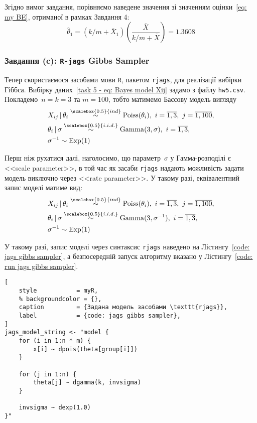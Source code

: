 Згідно вимог завдання, порівняємо наведене значення зі значенням оцінки~\eqref{eq: my BE}, отриманої в рамках Завдання 4:
\begin{equation}\label{eq: R-base theta star estimation}
    \widehat{\theta}_1 = \left( k/m+\overline{X}_1 \right)\left( \frac{\overline{X}}{k/m+\overline{X}} \right) = 1.3608
\end{equation}

\newpage
\subsubsection*{Завдання (c): \texttt{R-jags} Gibbs Sampler}

Тепер скористаємося засобами мови \texttt{R}, пакетом \texttt{rjags}, для реалізації вибірки Гіббса. Вибірку даних~\eqref{task 5 - eq: Bayes model Xij} задамо з файлу \texttt{hw5.csv}. Покладемо~$n=k=3$ та $m=100$, тобто матимемо Баєсову модель вигляду
\begin{align}
    & X_{ij} \,|\, \theta_i \overset{\scalebox{0.5}{ind}}{\sim} \mathrm{Poiss}(\theta_i),\ i=\overline{1,3},\ j=\overline{1,100}, \\
    & \theta_i \,|\, \sigma \overset{\scalebox{0.5}{i.i.d.}}{\sim} \mathrm{Gamma}(3,\sigma),\ i=\overline{1,3}, \\
    & \sigma^{-1} \sim \mathrm{Exp}(1)
\end{align}

Перш ніж рухатися далі, наголосимо, що параметр~$\sigma$ у Гамма-розподілі є <<scale parameter>>, в той час як засаби \texttt{rjags} надають можливість задати модель виключно через <<rate parameter>>. У такому разі, еквівалентний запис моделі матиме вид:
\begin{align}
    & X_{ij} \,|\, \theta_i \overset{\scalebox{0.5}{ind}}{\sim} \mathrm{Poiss}(\theta_i),\ i=\overline{1,3},\ j=\overline{1,100}, \\
    & \theta_i \,|\, \sigma \overset{\scalebox{0.5}{i.i.d.}}{\sim} \mathrm{Gamma}(3,\sigma^{-1}),\ i=\overline{1,3}, \\
    & \sigma^{-1} \sim \mathrm{Exp}(1)
\end{align}

У такому разі, запис моделі через синтаксис \texttt{rjags} наведено на Лістингу~\ref{code: jags gibbs sampler}, а безпосередній запуск алгоритму вказано у Лістингу~\ref{code: run jags gibbs sampler}.

\vspace{0.4cm}
\begin{lstlisting}[
    style           = myR, 
    % backgroundcolor = {},
    caption         = {Задана модель засобами \texttt{rjags}},
    label           = {code: jags gibbs sampler},
]
jags_model_string <- "model {
    for (i in 1:n * m) {
        x[i] ~ dpois(theta[group[i]])
    }

    for (j in 1:n) {
        theta[j] ~ dgamma(k, invsigma)
    }

    invsigma ~ dexp(1.0)
}"
\end{lstlisting}

